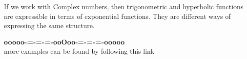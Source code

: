 \documentclass{ximera}
\begin{document}
If we work with Complex numbers, then trigonometric and hyperbolic functions are expressible in terms of exponential functions.  They are different ways of expressing the same structure.






















\begin{center}
\textbf{\textcolor{green!50!black}{ooooo-=-=-=-ooOoo-=-=-=-ooooo}} \\

more examples can be found by following this link\\ 

\end{center}
\end{document}
